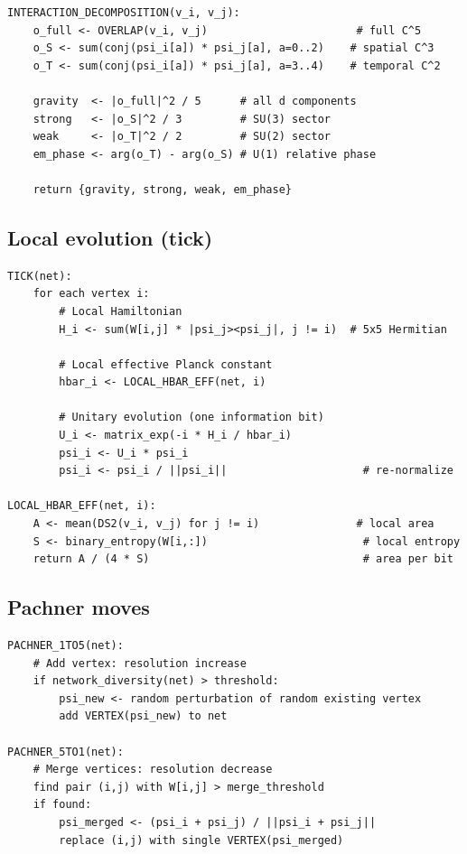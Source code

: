 \begin{verbatim}
INTERACTION_DECOMPOSITION(v_i, v_j):
    o_full <- OVERLAP(v_i, v_j)                       # full C^5
    o_S <- sum(conj(psi_i[a]) * psi_j[a], a=0..2)    # spatial C^3
    o_T <- sum(conj(psi_i[a]) * psi_j[a], a=3..4)    # temporal C^2

    gravity  <- |o_full|^2 / 5      # all d components
    strong   <- |o_S|^2 / 3         # SU(3) sector
    weak     <- |o_T|^2 / 2         # SU(2) sector
    em_phase <- arg(o_T) - arg(o_S) # U(1) relative phase

    return {gravity, strong, weak, em_phase}
\end{verbatim}

\subsection{Local evolution (tick)}

\begin{verbatim}
TICK(net):
    for each vertex i:
        # Local Hamiltonian
        H_i <- sum(W[i,j] * |psi_j><psi_j|, j != i)  # 5x5 Hermitian

        # Local effective Planck constant
        hbar_i <- LOCAL_HBAR_EFF(net, i)

        # Unitary evolution (one information bit)
        U_i <- matrix_exp(-i * H_i / hbar_i)
        psi_i <- U_i * psi_i
        psi_i <- psi_i / ||psi_i||                     # re-normalize

LOCAL_HBAR_EFF(net, i):
    A <- mean(DS2(v_i, v_j) for j != i)               # local area
    S <- binary_entropy(W[i,:])                        # local entropy
    return A / (4 * S)                                 # area per bit
\end{verbatim}

\subsection{Pachner moves}

\begin{verbatim}
PACHNER_1TO5(net):
    # Add vertex: resolution increase
    if network_diversity(net) > threshold:
        psi_new <- random perturbation of random existing vertex
        add VERTEX(psi_new) to net

PACHNER_5TO1(net):
    # Merge vertices: resolution decrease
    find pair (i,j) with W[i,j] > merge_threshold
    if found:
        psi_merged <- (psi_i + psi_j) / ||psi_i + psi_j||
        replace (i,j) with single VERTEX(psi_merged)
\end{verbatim}

